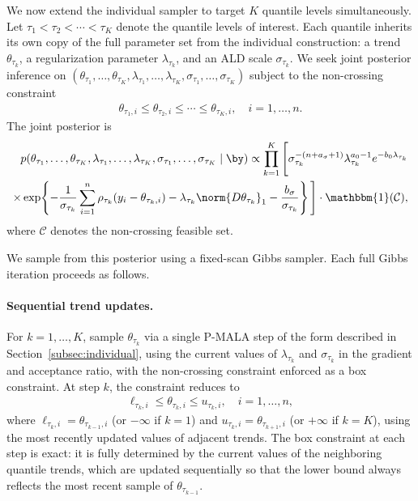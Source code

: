 We now extend the individual sampler to target $K$ quantile levels simultaneously. Let $\tau_1 < \tau_2 < \cdots < \tau_K$ denote the quantile levels of interest. Each quantile inherits its own copy of the full parameter set from the individual construction: a trend $\theta_{\tau_k}$, a regularization parameter $\lambda_{\tau_k}$, and an ALD scale $\sigma_{\tau_k}$. We seek joint posterior inference on $(\theta_{\tau_1}, \ldots, \theta_{\tau_K}, \lambda_{\tau_1}, \ldots, \lambda_{\tau_K}, \sigma_{\tau_1}, \ldots, \sigma_{\tau_K})$ subject to the non-crossing constraint
\begin{align*}
    \theta_{\tau_1, i} \leq \theta_{\tau_2, i} \leq \cdots
    \leq \theta_{\tau_K, i}, \quad i = 1, \ldots, n.
\end{align*}
The joint posterior is
\begin{align*}
    p(\theta_{\tau_1}, \ldots, \theta_{\tau_K},
    \lambda_{\tau_1}, \ldots, \lambda_{\tau_K},
    \sigma_{\tau_1}, \ldots, \sigma_{\tau_K} \mid \by)
    \propto \prod_{k=1}^K
    \Bigg[
    \sigma_{\tau_k}^{-(n + a_\sigma + 1)}
    \lambda_{\tau_k}^{a_0 - 1} e^{-b_0 \lambda_{\tau_k}} \\
    \times \exp\!\left\{-\frac{1}{\sigma_{\tau_k}}
    \sum_{i=1}^n \rho_{\tau_k}(y_i - \theta_{\tau_k, i})
    - \lambda_{\tau_k} \norm{D\theta_{\tau_k}}_1
    - \frac{b_\sigma}{\sigma_{\tau_k}}\right\}
    \Bigg]
    \cdot \mathbbm{1}(\mathcal{C}),
\end{align*}
where $\mathcal{C}$ denotes the non-crossing feasible set.

We sample from this posterior using a fixed-scan Gibbs sampler. Each full Gibbs iteration proceeds as follows.

\paragraph{Sequential trend updates.}
For $k = 1, \ldots, K$, sample $\theta_{\tau_k}$ via a single P-MALA step of the form described in Section~\ref{subsec:individual}, using the current values of $\lambda_{\tau_k}$ and $\sigma_{\tau_k}$ in the gradient and acceptance ratio, with the non-crossing constraint enforced as a box constraint. At step $k$, the constraint reduces to
\begin{align*}
    \ell_{\tau_k, i} \leq \theta_{\tau_k, i} \leq u_{\tau_k, i},
    \quad i = 1, \ldots, n,
\end{align*}
where $\ell_{\tau_k, i} = \theta_{\tau_{k-1}, i}$ (or $-\infty$ if $k = 1$) and $u_{\tau_k, i} = \theta_{\tau_{k+1}, i}$ (or $+\infty$ if $k = K$), using the most recently updated values of adjacent trends. The box constraint at each step is exact: it is fully determined by the current values of the neighboring quantile trends, which are updated sequentially so that the lower bound always reflects the most recent sample of $\theta_{\tau_{k-1}}$.

